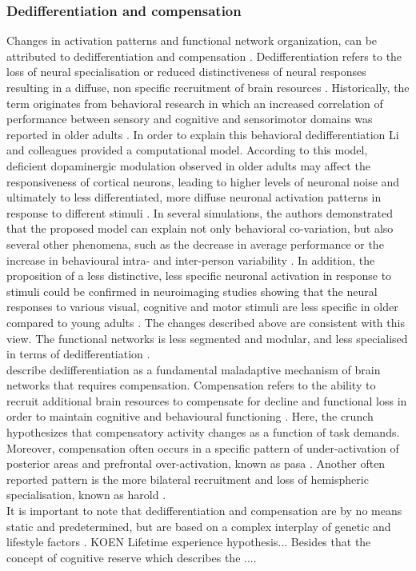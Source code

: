 \subsubsection{Dedifferentiation and compensation}
Changes in activation patterns and functional network organization, can be attributed to dedifferentiation and compensation \cite{Grady2012}. Dedifferentiation refers to the loss of neural specialisation or reduced distinctiveness of neural responses resulting in a diffuse, non specific recruitment of brain resources \cite{Koen2019}. Historically, the term originates from behavioral research in which an increased correlation of performance between sensory and cognitive and sensorimotor domains was reported in older adults \cite{Baltes1997,Li2002}. In order to explain this behavioral dedifferentiation Li and colleagues \cite{Li2001, Li2002} provided a computational model. According to this model, deficient dopaminergic modulation observed in older adults may affect the responsiveness of cortical neurons, leading to higher levels of neuronal noise and ultimately to less differentiated, more diffuse neuronal activation patterns in response to different stimuli \cite{Li2001,Li2002}. In several simulations, the authors demonstrated that the proposed model can explain not only behavioral co-variation, but also several other phenomena, such as the decrease in average performance or the increase in behavioural intra- and inter-person variability \cite{Li2000,Li2002}. In addition, the proposition of a less distinctive, less specific neuronal activation in response to stimuli could be confirmed in neuroimaging studies showing that the neural responses to various visual, cognitive and motor stimuli are less specific in older compared to young adults \cite{Tucker2019, Koen2019,Carb2011}. The changes described above are consistent with this view. The functional networks is less segmented and modular, and less specialised in terms of dedifferentiation \cite{Koen2019, Sala-Llonch2015}.\\
\citeauthor{Fornito2015}\cite{Fornito2015} describe dedifferentiation as a fundamental maladaptive mechanism of brain networks that requires compensation. Compensation refers to the ability to recruit additional brain resources to compensate for decline and functional loss in order to maintain cognitive and behavioural functioning \cite{Reuter-Lorenz2010, Grady2012}. Here, the \gls{crunch} hypothesizes that compensatory activity changes as a function of task demands. Moreover, compensation often occurs in a specific pattern of under-activation of posterior areas and prefrontal over-activation, known as \gls{pasa} \cite{Davis2007}. Another often reported pattern is the more bilateral recruitment and loss of hemispheric specialisation, known as \gls{harold} \cite{Cabeza2002}.\\
It is important to note that dedifferentiation and compensation are by no means static and predetermined, but are based on a complex interplay of genetic and lifestyle factors \cite{Smith2020,Koen2019,Douw2014}. KOEN Lifetime experience hypothesis... Besides that the concept of cognitive reserve which describes the ....  

